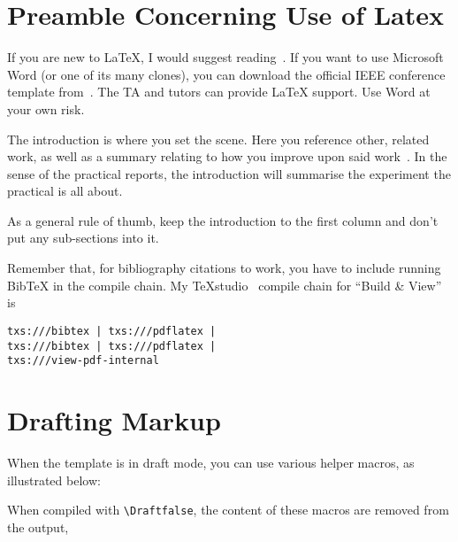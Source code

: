 
\section{\color{red}Preamble Concerning Use of Latex}

If you are new to \LaTeX{}, I would suggest reading~\cite{Oetiker_2015}.  If you want to use Microsoft Word (or one of its many clones), you can download the official IEEE conference template from~\cite{Word_Template}.  The TA and tutors can provide \LaTeX{} support.  Use Word at your own risk.

The introduction is where you set the scene.  Here you reference other, related work, as well as a summary relating to how you improve upon said work~\cite{BibExample}.  In the sense of the practical reports, the introduction will summarise the experiment the practical is all about.

As a general rule of thumb, keep the introduction to the first column and don't put any \mbox{sub-sections} into it.

Remember that, for bibliography citations to work, you have to include running Bib\TeX{} in the compile chain.  My TeXstudio~\cite{TeXstudio} compile chain for ``Build \& View'' is\linebreak
\vspace{-6mm}
\begin{verbatim}
txs:///bibtex | txs:///pdflatex |
txs:///bibtex | txs:///pdflatex |
txs:///view-pdf-internal
\end{verbatim}

\clearpage

\section{\color{red}Drafting Markup}

When the template is in draft mode, you can use various helper macros, as illustrated below:

      When compiled with \verb|\Draftfalse|, the content of these macros are removed from the output, 

